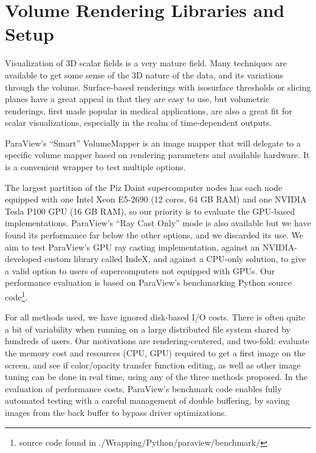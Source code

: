 \documentclass[final,5p,times,twocolumn]{elsarticle}
\begin{document}
\section{Volume Rendering Libraries and Setup}

Visualization of 3D scalar fields is a very mature field. Many techniques are
available to get some sense of the 3D nature of the data, and its variations
through the volume. Surface-based renderings with isosurface thresholds or
slicing planes have a great appeal in that they are easy to use, but volumetric
renderings, first made popular in medical applications, are also a great fit for
scalar visualizations, especially in the realm of time-dependent outputs.

ParaView's ``Smart'' VolumeMapper is an image mapper
that will delegate to a specific volume mapper based on rendering parameters and
available hardware. It is a convenient
wrapper to test multiple options.

The largest partition of the Piz Daint supercomputer
nodes has each node equipped with one Intel Xeon E5-2690 (12 cores, 64 GB RAM) and one NVIDIA
Tesla P100 GPU (16 GB RAM), so our priority is to evaluate the GPU-based implementations.
ParaView's ``Ray Cast Only'' mode is also available but we have found its performance far
below the other options, and we discarded its use. We aim to test ParaView's GPU
ray casting implementation, against an NVIDIA-developed custom library called
IndeX, and against a CPU-only solution, to give a valid option to users of
supercomputers not equipped with GPUs.
Our performance evaluation is based on ParaView's benchmarking Python source
code\footnote{source code found in ./Wrapping/Python/paraview/benchmark/}.

For all methods used, we have ignored disk-based I/O costs. There is often quite
a bit of variability when running on a large distributed file system shared by
hundreds of users. Our motivations are rendering-centered, and two-fold:
evaluate the memory cost and resources (CPU, GPU) required to get a first image
on the screen, and see if color/opacity transfer
function editing, as well as other image tuning can be done in real time, using
any of the three methods proposed. In the evaluation of performance costs, ParaView's
benchmark code enables fully automated testing with a careful management of
double buffering, by saving images from the back buffer to bypass driver optimizations.
\end{document}
